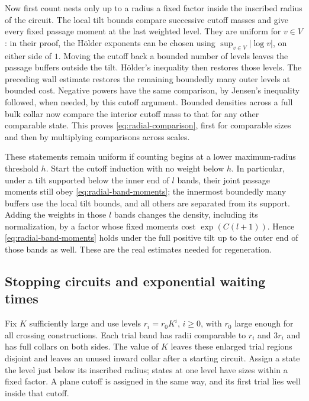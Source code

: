 Now first count nests only up to a radius a fixed factor inside the
inscribed radius of the circuit. The local tilt bounds compare
successive cutoff masses and give every fixed passage moment at the
last weighted level. They are uniform for $v\in V$: in their proof,
the H\"older exponents can be chosen using
$\sup_{v\in V}|\log v|$, on either side of $1$. Moving the cutoff
back a bounded number of levels leaves the passage buffers outside
the tilt. H\"older's inequality then restores those levels. The
preceding wall estimate restores the remaining boundedly many outer
levels at bounded cost. Negative powers have the same comparison,
by Jensen's inequality followed, when needed, by this cutoff argument.
Bounded densities across a full bulk collar now compare the interior
cutoff mass to that for any other comparable state. This proves
\eqref{eq:radial-comparison}, first for comparable sizes and then
by multiplying comparisons across scales.

These statements remain uniform if counting begins at a lower
maximum-radius threshold $h$. Start the cutoff induction with no
weight below $h$. In particular, under a tilt supported below the
inner end of $l$ bands, their joint passage moments still obey
\eqref{eq:radial-band-moments}; the innermost boundedly many buffers
use the local tilt bounds, and all others are separated from its
support. Adding the weights in those $l$ bands changes the density,
including its normalization, by a factor whose fixed moments cost
$\exp(C(l+1))$. Hence \eqref{eq:radial-band-moments} holds under the
full positive tilt up to the outer end of those bands as well.
These are the real estimates needed for
regeneration.

\subsection{Stopping circuits and exponential waiting times}

Fix $K$ sufficiently large and use levels $r_i=r_0K^i$, $i\ge0$,
with $r_0$ large enough for all crossing constructions. Each trial
band has radii comparable to $r_i$ and $3r_i$ and has full collars
on both sides. The value of $K$ leaves these enlarged trial regions
disjoint and leaves an unused inward collar after a starting circuit.
Assign a state the level just below its inscribed radius; states at
one level have sizes within a fixed factor. A plane cutoff is assigned
in the same way, and its first trial lies well inside that cutoff.

